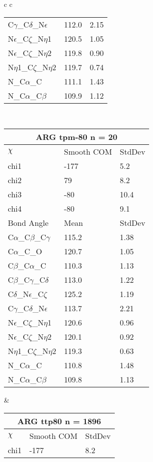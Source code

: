 \begin{longtable}{ c c }
\begin{tabular}{ l l l }
  C$\gamma$\_C$\delta$\_N$\epsilon$ & 112.0 & 2.15\\
  N$\epsilon$\_C$\zeta$\_N$\eta$1 & 120.5 & 1.05\\
  N$\epsilon$\_C$\zeta$\_N$\eta$2 & 119.8 & 0.90\\
  N$\eta$1\_C$\zeta$\_N$\eta$2 & 119.7 & 0.74\\
  N\_C$\alpha$\_C & 111.1 & 1.43\\
  N\_C$\alpha$\_C$\beta$ & 109.9 & 1.12\\
  \bottomrule
  \end{tabular}
  \\
  \begin{tabular}{ l l l }
  \toprule
  \multicolumn{3}{c}{ARG \textbf{tpm-80} n = 20} \\ \toprule
  $\chi$       & Smooth COM & StdDev \\ \midrule
  chi1 & -177 & 5.2 \\ 
  chi2 & 79 & 8.2 \\ 
  chi3 & -80 & 10.4 \\ 
  chi4 & -80 & 9.1 \\ \midrule
  Bond Angle   & Mean     & StdDev \\ \midrule
  C$\alpha$\_C$\beta$\_C$\gamma$ & 115.2 & 1.38\\
  C$\alpha$\_C\_O & 120.7 & 1.05\\
  C$\beta$\_C$\alpha$\_C & 110.3 & 1.13\\
  C$\beta$\_C$\gamma$\_C$\delta$ & 113.0 & 1.22\\
  C$\delta$\_N$\epsilon$\_C$\zeta$ & 125.2 & 1.19\\
  C$\gamma$\_C$\delta$\_N$\epsilon$ & 113.7 & 2.21\\
  N$\epsilon$\_C$\zeta$\_N$\eta$1 & 120.6 & 0.96\\
  N$\epsilon$\_C$\zeta$\_N$\eta$2 & 120.1 & 0.92\\
  N$\eta$1\_C$\zeta$\_N$\eta$2 & 119.3 & 0.63\\
  N\_C$\alpha$\_C & 110.8 & 1.48\\
  N\_C$\alpha$\_C$\beta$ & 109.8 & 1.13\\
  \bottomrule
  \end{tabular}
  &
  \begin{tabular}{ l l l }
  \toprule
  \multicolumn{3}{c}{ARG \textbf{ttp80} n = 1896} \\ \toprule
  $\chi$       & Smooth COM & StdDev \\ \midrule
  chi1 & -177 & 8.2 \\ 

\end{tabular}
\end{longtable}
